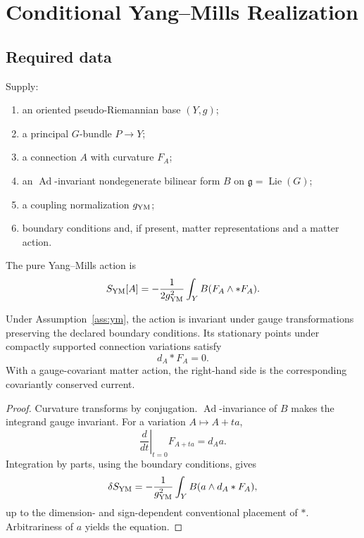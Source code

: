 \documentclass[11pt]{article}
\newcommand{\Ad}{\operatorname{Ad}}
\newcommand{\Lie}{\operatorname{Lie}}
\begin{document}
\section{Conditional Yang--Mills Realization}

\subsection{Required data}

\begin{assumption}\label{ass:ym}
Supply:
\begin{enumerate}
\item an oriented pseudo-Riemannian base $(Y,g)$;
\item a principal $G$-bundle $P\to Y$;
\item a connection $A$ with curvature $F_A$;
\item an $\Ad$-invariant nondegenerate bilinear form
$B$ on $\mathfrak g=\Lie(G)$;
\item a coupling normalization $g_{\rm YM}$;
\item boundary conditions and, if present, matter representations and a matter
action.
\end{enumerate}
\end{assumption}

The pure Yang--Mills action is
\[
 S_{\rm YM}[A]
 =-\frac{1}{2g_{\rm YM}^2}
 \int_Y B(F_A\wedge *F_A).
\]

\begin{theorem}
\label{thm:ym}
Under Assumption~\ref{ass:ym}, the action is invariant under gauge
transformations preserving the declared boundary conditions.  Its stationary
points under compactly supported connection variations satisfy
\[
 d_A *F_A=0.
\]
With a gauge-covariant matter action, the right-hand side is the corresponding
covariantly conserved current.
\end{theorem}

\begin{proof}
Curvature transforms by conjugation.  $\Ad$-invariance of $B$ makes the
integrand gauge invariant.  For a variation $A\mapsto A+ta$,
\[
 \left.\frac{d}{dt}\right|_{t=0}F_{A+ta}=d_Aa.
\]
Integration by parts, using the boundary conditions, gives
\[
 \delta S_{\rm YM}
 =-\frac{1}{g_{\rm YM}^2}
 \int_Y B(a\wedge d_A*F_A),
\]
up to the dimension- and sign-dependent conventional placement of $*$.
Arbitrariness of $a$ yields the equation.
\end{proof}
\end{document}

